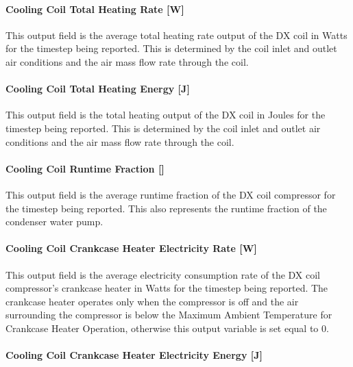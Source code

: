 \paragraph{Cooling Coil Total Heating Rate {[}W{]}}\label{heating-coil-total-heating-rate-w-7}

This output field is the average total heating rate output of the DX coil in Watts for the timestep being reported. This is determined by the coil inlet and outlet air conditions and the air mass flow rate through the coil.

\paragraph{Cooling Coil Total Heating Energy {[}J{]}}\label{heating-coil-total-heating-energy-j-7}

This output field is the total heating output of the DX coil in Joules for the timestep being reported. This is determined by the coil inlet and outlet air conditions and the air mass flow rate through the coil.

\paragraph{Cooling Coil Runtime Fraction {[]}}\label{heating-coil-runtime-fraction-5}

This output field is the average runtime fraction of the DX coil compressor for the timestep being reported. This also represents the runtime fraction of the condenser water pump.

\paragraph{Cooling Coil Crankcase Heater Electricity Rate {[}W{]}}\label{heating-coil-crankcase-heater-electric-powerw-2}

This output field is the average electricity consumption rate of the DX coil compressor's crankcase heater in Watts for the timestep being reported. The crankcase heater operates only when the compressor is off and the air surrounding the compressor is below the Maximum Ambient Temperature for Crankcase Heater Operation, otherwise this output variable is set equal to 0.

\paragraph{Cooling Coil Crankcase Heater Electricity Energy {[}J{]}}\label{heating-coil-crankcase-heater-electric-energy-j-3}

